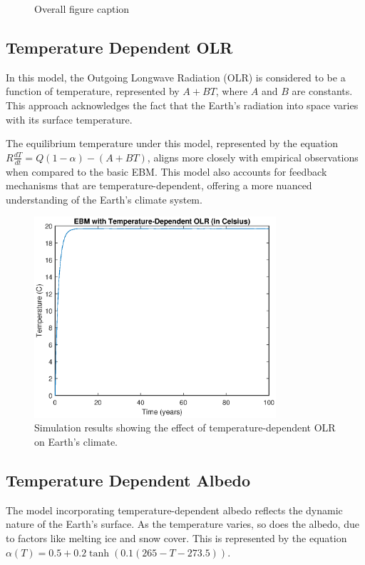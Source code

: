 \documentclass[12pt]{article}
\begin{document}
\begin{figure}[ht]
\begin{subfigure}[b]{\textwidth}
        \label{fig:sub2}
    \end{subfigure}
    \caption{Overall figure caption}
    \label{fig:test}
\end{figure}

\subsection{Temperature Dependent OLR}
In this model, the Outgoing Longwave Radiation (OLR) 
is considered to be a function of temperature, 
represented by \( A + BT \), 
where \( A \) and \( B \) are constants. 
This approach acknowledges the fact that the Earth's radiation 
into space varies with its surface temperature. 

The equilibrium temperature under this model, 
represented by the equation 
\( R\frac{dT}{dt} = Q(1 - \alpha) - (A + BT) \), 
aligns more closely with empirical observations 
when compared to the basic EBM. 
This model also accounts for feedback mechanisms 
that are temperature-dependent, 
offering a more nuanced understanding of the Earth's climate system. 

\begin{figure}[ht]
\centering
\includegraphics[width=0.8\textwidth]{temperature_dependent_OLR.eps}
\caption{Simulation results showing the effect of temperature-dependent OLR on Earth's climate.}
\label{fig:tempDepOLR}
\end{figure}

\subsection{Temperature Dependent Albedo}
The model incorporating temperature-dependent albedo 
reflects the dynamic nature of the Earth's surface. 
As the temperature varies, so does the albedo, 
due to factors like melting ice and snow cover. 
This is represented by the equation 
\( \alpha(T) = 0.5 + 0.2 \tanh(0.1(265 - T - 273.5)) \).
\end{document}
